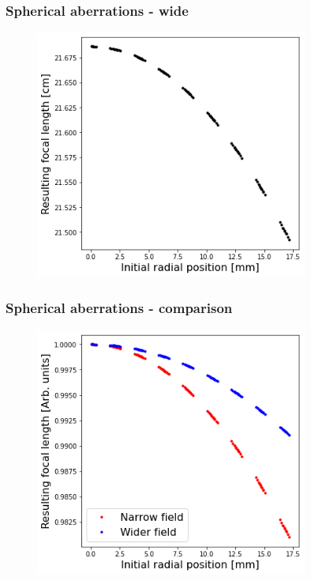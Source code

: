 \documentclass{beamer}
\begin{document}
\begin{frame}
  \frametitle{Spherical aberrations - wide}
  \begin{figure}
    \includegraphics[width=0.8\textwidth]{andriis_field_foci}
  \end{figure}
\end{frame}

\begin{frame}
  \frametitle{Spherical aberrations - comparison}
  \begin{figure}
    \includegraphics[width=0.8\textwidth]{foci_compare_two_fields}
  \end{figure}
\end{frame}



\end{document}
